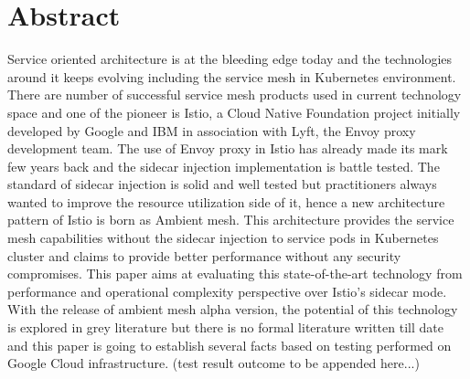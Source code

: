 \section*{Abstract}
Service oriented architecture is at the bleeding edge today and the technologies around it keeps evolving including the service mesh in Kubernetes environment. There are number of successful service mesh products used in current technology space and one of the pioneer is Istio, a Cloud Native Foundation project initially developed by Google and IBM in association with Lyft, the Envoy proxy development team. The use of Envoy proxy in Istio has already made its mark few years back and the sidecar injection implementation is battle tested. The standard of sidecar injection is solid and well tested but practitioners always wanted to improve the resource utilization side of it, hence a new architecture pattern of Istio is born as Ambient mesh. This architecture provides the service mesh capabilities without the sidecar injection to service pods in Kubernetes cluster and claims to provide better performance without any security compromises. This paper aims at evaluating this state-of-the-art technology from performance and operational complexity perspective over Istio's sidecar mode. With the release of ambient mesh alpha version, the potential of this technology is explored in grey literature but there is no formal literature written till date and this paper is going to establish several facts based on testing performed on Google Cloud infrastructure. (test result outcome to be appended here...)